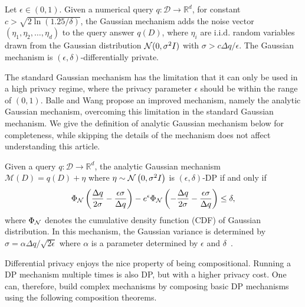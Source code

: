 \begin{definition}
\label{def:standarad_gaussian_mech}
Let $\epsilon \in (0, 1)$. 
Given a numerical query $q: \mathcal{D} \rightarrow \mathbb{R}^d$, for constant $c > \sqrt{2\ln (1.25/\delta)}$, the Gaussian mechanism adds the noise vector $(\eta_1, \eta_2, \dots, \eta_d)$ to the query answer $q(D)$, where $\eta_i$ are i.i.d. random variables drawn from the Gaussian distribution $\mathcal{N}(0, \sigma^2I)$ with $\sigma > c \Delta q / \epsilon$.
The Gaussian mechanism is $(\epsilon, \delta)$-differentially private.
\end{definition}

The standard Gaussian mechanism \cite{dwork2014algorithmic} has the limitation that it can only be used in a high privacy regime, where the privacy parameter $\epsilon$ should be within the range of $(0, 1)$.
Balle and Wang \cite{BW18analytic} propose an improved mechanism, namely the analytic Gaussian mechanism, overcoming this limitation in the standard Gaussian mechanism.
We give the definition of analytic Gaussian mechanism below for completeness, while skipping the details of the mechanism does not affect understanding this article.

\begin{definition}
\label{def:analytic_gaussian}
Given a query $q : \mathcal{D} \rightarrow \mathbb{R}^{d}$, the analytic Gaussian mechanism $\mathcal{M}(D) = q(D) + \eta$  where 
$\eta \sim {\mathcal{N}} \left( 0, \sigma^2 I \right)$ 
is $(\epsilon, \delta)$-DP if and only if 
$$
\Phi_{\mathcal{N}} \left( \frac{\Delta q}{2 \sigma} - \frac{\epsilon \sigma}{\Delta q} \right)
    - e^{\epsilon} \Phi_{\mathcal{N}} \left( - \frac{\Delta q}{2 \sigma} - \frac{\epsilon \sigma}{\Delta q} \right) 
    \leq \delta,
$$
where $\Phi_{\mathcal{N}}$ denotes the cumulative density function (CDF) of Gaussian distribution. In this mechanism, the Gaussian variance is determined by $\sigma = \alpha \Delta q / \sqrt{2\epsilon}$ where $\alpha$ is a parameter determined by $\epsilon$ and $\delta$~\cite{BW18analytic}.
\end{definition}
 

Differential privacy enjoys the nice property of being compositional.
Running a DP mechanism multiple times is also DP, but with a higher privacy cost.
One can, therefore, build complex mechanisms by composing basic DP mechanisms using the following composition theorems.


